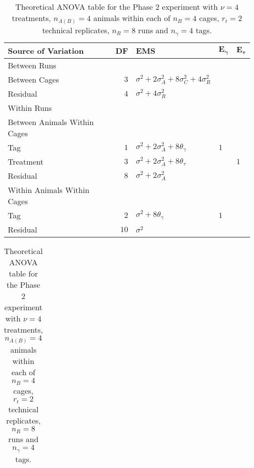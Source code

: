 \begin{table}[ht]
	\centering
	\caption{Theoretical ANOVA table for the Phase 2 experiment with $\nu = 4$ treatments, $n_{A(B)} = 4$ animals within each of $n_B = 4$ cages, $r_t = 2$ technical replicates, $n_R = 8$ runs and $n_\gamma = 4$ tags.}
	\begin{tabular}[t]{lrlll}
		\toprule
		\multicolumn{1}{l}{\textbf{Source of Variation}} & \multicolumn{1}{l}{\textbf{DF}} & \multicolumn{1}{l}{\textbf{EMS}}& \multicolumn{1}{l}{$\bm{E_{\gamma}}$}&\multicolumn{1}{l}{$\bm{E_{\tau}}$}\\
		\midrule
		Between Runs &  &  & & \\
		\quad Between Cages & $3$ & $\sigma^2+2\sigma_{A}^2+8\sigma_{C}^2+4\sigma_{R}^2$ & & \\
		\quad Residual & $4$ & $\sigma^2+4\sigma_{R}^2$ & & \\ \hline
		Within Runs &  &  & & \\
		\quad Between Animals Within Cages &  &  & & \\
		\quad \quad Tag & $1$ & $\sigma^2+2\sigma_{A}^2+8\theta_{\gamma}$ &$1$ & \\
		\quad \quad Treatment & $3$ & $\sigma^2+2\sigma_{A}^2+8\theta_{\tau}$ & & $1$\\
		\quad \quad Residual & $8$ & $\sigma^2+2\sigma_{A}^2$ & & \\\hline
		\quad Within Animals Within Cages &  &  & & \\
		\quad \quad Tag & $2$ & $\sigma^2+8\theta_{\gamma}$ &$1$ & \\
		\quad \quad Residual & $10$ & $\sigma^2$ & & \\
		\bottomrule
	\end{tabular}
	\label{tab:Phase2ANOVA11} 
 
 \begin{tabular}{l}
 	\\	
 \end{tabular} 
 

\end{table}
